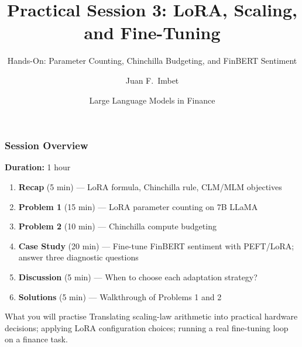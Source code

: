 \documentclass[9pt,t]{beamer}
\title{Practical Session 3: LoRA, Scaling, and Fine-Tuning}
\subtitle{Hands-On: Parameter Counting, Chinchilla Budgeting, and FinBERT Sentiment}
\author{Juan F.\ Imbet}
\institute{Paris Dauphine -- PSL University}
\date{Large Language Models in Finance}
\begin{document}
\begin{frame}
\frametitle{}
\titlepage
\end{frame}

\begin{frame}
\frametitle{Session Overview}

\textbf{Duration:} 1 hour

\medskip
\begin{enumerate}
  \item \textbf{Recap} (5 min) --- LoRA formula, Chinchilla rule, CLM/MLM objectives
  \item \textbf{Problem 1} (15 min) --- LoRA parameter counting on 7B LLaMA
  \item \textbf{Problem 2} (10 min) --- Chinchilla compute budgeting
  \item \textbf{Case Study} (20 min) --- Fine-tune FinBERT sentiment with PEFT/LoRA;
        answer three diagnostic questions
  \item \textbf{Discussion} (5 min) --- When to choose each adaptation strategy?
  \item \textbf{Solutions} (5 min) --- Walkthrough of Problems 1 and 2
\end{enumerate}

\medskip
\begin{block}{What you will practise}
  Translating scaling-law arithmetic into practical hardware decisions; applying
  LoRA configuration choices; running a real fine-tuning loop on a finance task.
\end{block}
\end{frame}
\end{document}
